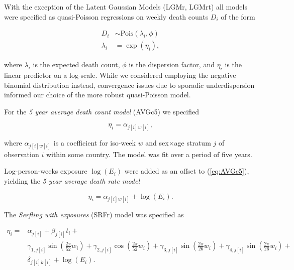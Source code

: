 \documentclass[12pt]{article}
\begin{document}
With the exception of the Latent Gaussian Models (LGMr, LGMrt) all models were specified as quasi-Poisson regressions on weekly death counts $D_i$ of the form

\begin{equation}
\begin{aligned}
  D_i &\sim \text{Pois}(\lambda_i, \phi) \\
  \lambda_i &= \exp(\eta_i),
\end{aligned}
\label{eq:quasipoisson}
\end{equation}

where $\lambda_i$ is the expected death count, $\phi$ is the dispersion factor, and $\eta_i$ is the linear predictor on a log-scale. While we considered employing the negative binomial distribution instead, convergence issues due to sporadic underdispersion informed our choice of the more robust quasi-Poisson model.

For the \emph{5 year average death count model} (AVGc5) we specified

\begin{equation}
  \eta_i = \alpha_{j[i]w[i]},
  \label{eq:AVGc5}
\end{equation}

where $\alpha_{j[i]w[i]}$ is a coefficient for iso-week $w$ and sex$\times$age stratum $j$ of observation $i$ within some country. The model was fit over a period of five years.

Log-person-weeks exposure $\log(E_i)$ were added as an offset to (\ref{eq:AVGc5}), yielding the \emph{5 year average death rate model}

\begin{equation}
  \eta_i = \alpha_{j[i]w[i]} + \log(E_i).
  \label{eq:AVGr5}
\end{equation}

The \emph{Serfling with exposures} (SRFr) model was specified as

\begin{equation}
  \begin{aligned}
    \eta_i =& \alpha_{j[i]} + \beta_{j[i]}t_i + \\
  & \gamma_{1,j[i]}\sin\left(\frac{2\pi}{52}w_i\right) +
    \gamma_{2,j[i]}\cos\left(\frac{2\pi}{52}w_i\right) +
    \gamma_{3,j[i]}\sin\left(\frac{2\pi}{26}w_i\right) +
    \gamma_{4,j[i]}\sin\left(\frac{2\pi}{26}w_i\right) + \\
  & \delta_{j[i]k[i]} + \log(E_i).
  \end{aligned}
  \label{eq:SRFr}
\end{equation}
\end{document}
